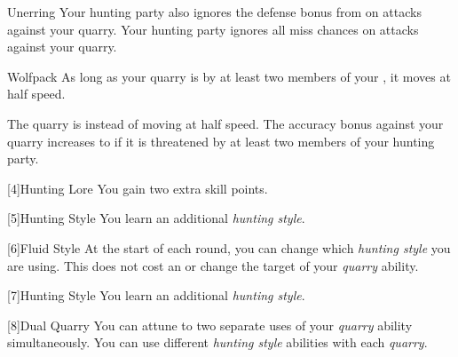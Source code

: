{\begin{ability}{Unerring}
                \rankline
                 Your hunting party also ignores the defense bonus from  on attacks against your quarry.
                 Your hunting party ignores all miss chances on attacks against your quarry.
            \end{ability}

            \begin{ability}{Wolfpack}
                As long as your quarry is  by at least two members of your , it moves at half speed.

                \rankline
                 The quarry is \immobilized instead of moving at half speed.
                 The accuracy bonus against your quarry increases to  if it is threatened by at least two members of your hunting party.
            \end{ability}
        }

        [4]{Hunting Lore} You gain two extra skill points.

        [5]{Hunting Style}
        You learn an additional \textit{hunting style}.

        [6]{Fluid Style}
        At the start of each round, you can change which \textit{hunting style} you are using.
        This does not cost an  or change the target of your \textit{quarry} ability.

        [7]{Hunting Style}
        You learn an additional \textit{hunting style}.

        [8]{Dual Quarry} You can attune to two separate uses of your \textit{quarry} ability simultaneously.
        You can use different \textit{hunting style} abilities with each \textit{quarry}.

\newpage
